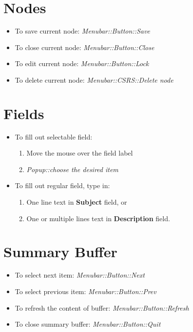 \section* {Nodes}
\begin{itemize}
\item To save current node: {\it Menubar::Button::Save}
\item To close current node: {\it Menubar::Button::Close}
\item To edit current node: {\it Menubar::Button::Lock}
\item To delete current node: {\it Menubar::CSRS::Delete node}
\end{itemize}


\section* {Fields}
\begin{itemize}
\item To fill out selectable field:
      \begin{enumerate}
        \item Move the mouse over the field label
        \item {\it Popup::choose the desired item}
      \end{enumerate}
\item To fill out regular field, type in:
      \begin{enumerate}
        \item One line text in {\bf Subject} field, or
        \item One or multiple lines text in {\bf Description} field.        
      \end{enumerate}
\end{itemize}

\section* {Summary Buffer}
\begin{itemize}
\item To select next item: {\it Menubar::Button::Next}
\item To select previous item: {\it Menubar::Button::Prev}
\item To refresh the content of buffer: {\it Menubar::Button::Refresh}
\item To close summary buffer: {\it Menubar::Button::Quit}
\end{itemize}

